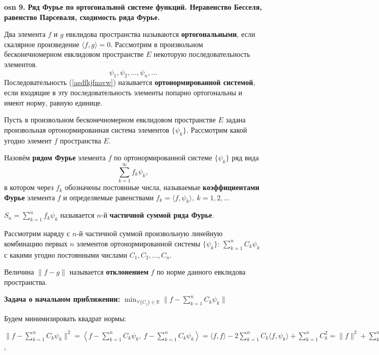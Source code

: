 \textbf{\LARGE osn 9. Ряд Фурье по ортогональной системе функций. Неравенство Бесселя, равенство Парсеваля,  сходимость ряда Фурье.}

Два элемента $f$ и $g$ евклидова пространства называются \textbf{ортогональными}, если скалярное произведение $\langle f, g \rangle = 0$.
Рассмотрим в произвольном бесконечномерном евклидовом пространстве $E$ некоторую последовательность элементов.
\begin{equation}
    \psi_1, \psi_2, \dots, \psi_n, \dots
    \label{asdfkjfnavw}
\end{equation}
Последовательность (\ref{asdfkjfnavw}) называется \textbf{ортонормированной системой}, если входящие в эту последовательность элементы попарно ортогональны и имеют норму, равную единице.

Пусть в произвольном бесконечномерном евклидовом пространстве $E$ задана произвольная ортонормированная система элементов $\{\psi_k\}$. Рассмотрим какой угодно элемент $f$ пространства $E$.

Назовём \textbf{рядом Фурье} элемента $f$ по ортонормированной системе $\{\psi_k\}$ ряд вида
$$\displaystyle\sum_{k=1}^{\infty} f_k\psi_k,$$
в котором через $f_k$ обозначены постоянные числа, называемые \textbf{коэффициентами Фурье} элемента $f$ и определяемые равенствами $f_k =\langle f,\psi_k\rangle, ~ k=1,2,\dots$

$S_n =\displaystyle\sum_{k=1}^{n}f_k\psi_k$ называется $n$-й \textbf{частичной суммой ряда Фурье}.

Рассмотрим наряду с $n$-й частичной суммой произвольную линейную комбинацию первых $n$ элементов ортонормированной системы $\{\psi_k\}$: $\displaystyle\sum_{k=1}^{n}C_k\psi_k$ с какими угодно постоянными числами $C_1, C_2, \dots, C_n$.

Величина $ \| f-g \|$ называется \textbf{отклонением} $f$ по норме данного евклидова пространства.

\textbf{Задача о начальном приближении:} $\displaystyle\min_{\forall\{C_j\}\in\mathbb{R}}  \|f-\displaystyle\sum_{k=1}^{n}C_k\psi_k \|$

Будем минимизировать квадрат нормы:

$ \| f-\displaystyle\sum_{k=1}^{n}C_k\psi_k \|^2 =  
\left\langle f-\displaystyle\sum_{k=1}^{n}C_k\psi_k, ~ f-\displaystyle\sum_{k=1}^{n}C_k\psi_k \right\rangle = 
\langle f, f \rangle - 2\displaystyle\sum_{k=1}^{n}C_k\langle f, \psi_k \rangle + \displaystyle\sum_{k=1}^{n} C_k^2 = 
\| f\|^2 + \displaystyle\sum_{k=1}^{n}(C_k^2-2C_kf_k) = 
\left\{ \pm \displaystyle\sum_{k=1}^{n}f_k^2 \right\} = 
\| f\|^2 - \displaystyle\sum_{k=1}^{n}f_k^2 + \displaystyle\sum_{k=1}^{n}(C_k-f_k)^2$,

